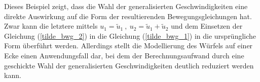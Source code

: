Dieses Beispiel zeigt, dass die Wahl der generalisierten Geschwindigkeiten eine direkte Auswirkung auf die Form der resultierenden Bewegungsgleichungen hat. Zwar kann die letztere mittels $u_1 = \tilde{u}_1 \ ,\ u_2 = \tilde{u}_1 + \tilde{u}_2$ und dem Einsetzen der Gleichung (\ref{tilde_bwg_2}) in die Gleichung (\ref{tilde_bwg_1}) in die ursprüngliche Form überführt werden. Allerdings stellt die Modellierung des Würfels auf einer Ecke einen Anwendungsfall dar, bei dem der Berechnungsaufwand durch eine geschickte Wahl der generalisierten Geschwindigkeiten deutlich reduziert werden kann.